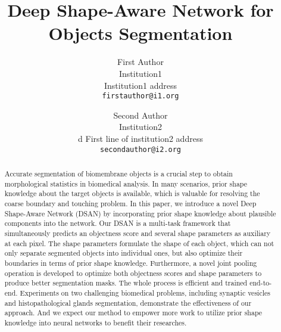 \documentclass[10pt,twocolumn,letterpaper]{article}
\begin{document}
\title{Deep Shape-Aware Network for Objects Segmentation}

\author{First Author\\
Institution1\\
Institution1 address\\
{\tt\small firstauthor@i1.org}
\and
Second Author\\
Institution2\\d
First line of institution2 address\\
{\tt\small secondauthor@i2.org}
}

\maketitle


\begin{abstract}
   Accurate segmentation of biomembrane objects is a crucial step to obtain morphological statistics in biomedical analysis.
   In many scenarios, prior shape knowledge about the target objects is available, which is valuable for resolving the coarse boundary and touching problem.
   In this paper, we introduce a novel Deep Shape-Aware Network (DSAN) by incorporating prior shape knowledge about plausible components into the network.
   Our DSAN is a multi-task framework that simultaneously predicts an objectness score and several shape parameters as auxiliary at each pixel.
   The shape parameters formulate the shape of each object, which can not only separate segmented objects into individual ones, but also optimize their boundaries in terms of prior shape knowledge.
   Furthermore, a novel joint pooling operation is developed to optimize both objectness scores and shape parameters to produce better segmentation masks.
   The whole process is efficient and trained end-to-end.
   Experiments on two challenging biomedical problems, including synaptic vesicles and histopathological glands segmentation, demonstrate the effectiveness of our approach.
   And we expect our method to empower more work to utilize prior shape knowledge into neural networks to benefit their researches.

\end{abstract}
\end{document}
